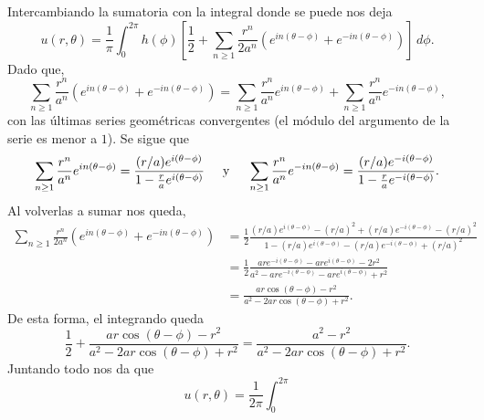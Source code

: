 \begin{Solucion}
\begin{enumerate}[label=(\alph*), topsep=3pt, itemsep=2pt]
	Intercambiando la sumatoria con la integral donde se puede nos
	deja
	\begin{displaymath}
		u(r, \theta) 
		=
		\frac{1}{\pi}
		\int_{0}^{2\pi}
		h(\phi)
		\left[
		\frac{1}{2} +
		\sum_{n\ge 1} 
		\frac{r^{n}}{2 a^n} 
		\left( e^{in(\theta - \phi)} + e^{-in(\theta - \phi)} \right)
		\right]
		\, d\phi.
	\end{displaymath}
	Dado que,
	\begin{displaymath}
		\sum_{n\ge 1} 
		\frac{r^{n}}{a^n} 
		\left( e^{in(\theta - \phi)} + e^{-in(\theta - \phi)} \right)
		=
		\sum_{n\ge 1} 
			\frac{r^{n}}{a^n} 
			e^{in(\theta - \phi)}
		+
		\sum_{n\ge 1} 
			\frac{r^{n}}{a^n} 
			e^{-in(\theta - \phi)},
	\end{displaymath}
	con las últimas series geométricas convergentes (el módulo del
	argumento de la serie es menor a \(1\)). Se sigue que
	\begin{displaymath}
		\sum_{n\ge 1}
			\frac{r^n}{a^n}
			e^{in(\theta - \phi)}
		=
		\frac
			{(r/a) e^{i(\theta-\phi)}}
			{1 - \frac{r}{a} e^{i(\theta-\phi)}}
		\hspace{.5cm} \text{y} \hspace{.5cm}
		\sum_{n\ge 1}
			\frac{r^n}{a^n}
			e^{-in(\theta - \phi)}
		=
		\frac
			{(r/a) e^{-i(\theta-\phi)}}
			{1 - \frac{r}{a} e^{-i(\theta-\phi)}}.
	\end{displaymath}
	Al volverlas a sumar nos queda,
	\begin{align*}
		\sum_{n\ge 1} 
		\frac{r^{n}}{2 a^n} 
		\left( e^{in(\theta - \phi)} + e^{-in(\theta - \phi)} \right)
		&=
		\frac{1}{2}
		\frac
		{(r/a) e^{i(\theta-\phi)} - (r/a)^2 + (r/a)
		e^{-i(\theta-\phi)} - (r/a)^2}
		{1 - (r/a) e^{i(\theta-\phi)} - (r/a) e^{-i(\theta-\phi)} + (r/a)^2}
		\\&=
		\frac{1}{2}
		\frac
		{ar e^{-i(\theta-\phi)} - ar e^{i(\theta-\phi)} - 2r^2}
		{a^2 - ar e^{-i(\theta-\phi)} - ar e^{i(\theta-\phi)} + r^2}
		\\&=
		\frac
		{ar\cos(\theta-\phi) - r^2}
		{a^2 - 2ar \cos(\theta- \phi) + r^2}.
	\end{align*}
	De esta forma, el integrando queda
	\begin{displaymath}
		\frac{1}{2} +
		\frac
		{ar\cos(\theta-\phi) - r^2}
		{a^2 - 2ar \cos(\theta- \phi) + r^2}
		=
		\frac
		{a^2 - r^2}
		{a^2 - 2ar \cos(\theta- \phi) + r^2}.
	\end{displaymath}
	Juntando todo nos da que
	\begin{displaymath}
		u(r,\theta)
		=
		\frac{1}{2\pi}
		\int_{0}^{2\pi}

\end{displaymath}
\end{enumerate}
\end{Solucion}
